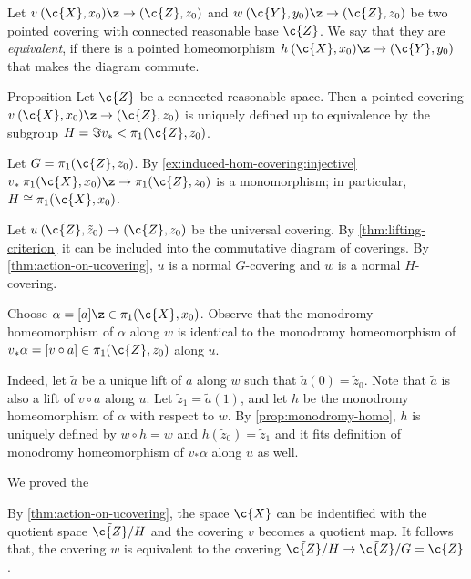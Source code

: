 Let
$v\:(\c{X},x_0)\z\to (\c{Z},z_0)$ and $w\:(\c{Y},y_0)\z\to (\c{Z},z_0)$ be two pointed covering with connected reasonable base $\c{Z}$.
We say that they are \emph{equivalent}, if there is a pointed homeomorphism $h\:(\c{X},x_0)\z\to(\c{Y},y_0)$ that makes the diagram commute.

\begin{thm}{Proposition}\label{prop:classification-coverings}
Let $\c{Z}$ be a connected reasonable space.
Then a pointed covering $v\:(\c{X},x_0)\z\to (\c{Z},z_0)$ is uniquely defined up to equivalence by the subgroup $H=\Im v_*<\pi_1(\c{Z},z_0)$.
\end{thm}

Let $G=\pi_1(\c{Z}, z_0)$.
By \ref{ex:induced-hom-covering:injective} $v_*\:\pi_1(\c{X},x_0)\z\to \pi_1(\c{Z},z_0)$ is a monomorphism; in particular, $H\cong \pi_1(\c{X},x_0)$.

\begin{figure}
\vskip-2mm
\centering
{}
\end{figure}

Let $u\:(\tilde{\c{Z}},\tilde z_0)\to (\c{Z}, z_0)$ be the universal covering.
By \ref{thm:lifting-criterion} it can be included into the commutative diagram of coverings.
By \ref{thm:action-on-ucovering}, $u$ is a normal $G$-covering and $w$ is a normal $H$-covering.

Choose $\alpha=[a]\z\in \pi_1(\c{X},x_0)$.
Observe that the monodromy homeomorphism of $\alpha$ along $w$ is identical to the monodromy  homeomorphism of $v_*\alpha=[v\circ a]\in \pi_1(\c{Z},z_0)$ along $u$.

Indeed, let $\tilde a$ be a unique lift of $a$ along $w$ such that $\tilde a(0)=\tilde z_0$.
Note that $\tilde a$ is also a lift of $v\circ a$ along $u$.
Let $\tilde z_1=\tilde a(1)$, and let $h$ be the monodromy homeomorphism of $\alpha$ with respect to $w$.
By \ref{prop:monodromy-homo}, $h$ is uniquely defined by $w\circ h=w$ and $h(\tilde z_0) = \tilde z_1$ and it fits definition of monodromy homeomorphism of $v_*\alpha$ along $u$ as well.

We proved the

By \ref{thm:action-on-ucovering}, the space $\c{X}$ can be indentified with the quotient space $\tilde{\c{Z}}/H$ and the covering $v$ becomes a quotient map.
It follows that, the covering $w$ is equivalent to the covering $\tilde{\c{Z}}/H\to \tilde{\c{Z}}/G=\c{Z}$.

